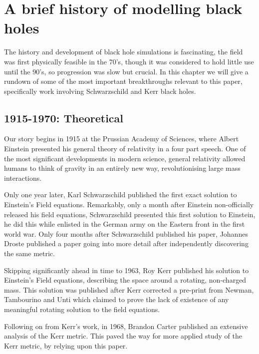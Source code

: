 \documentclass[oneside,openright,frontopenright, singlespacing]{dmathesis}
\begin{document}
\chapter{A brief history of modelling black holes}\label{chap:Chapter1}

	The history and development of black hole simulations is fascinating, the field was first physically feasible in the 70's, though it was considered to hold little use until the 90's, so progression was slow but crucial. In this chapter we will give a rundown of some of the most important breakthroughs relevant to this paper, specifically work involving Schwarzschild and Kerr black holes.

\section{1915-1970: Theoretical}\label{sec:Section1.1}

	Our story begins in 1915 at the Prussian Academy of Sciences, where Albert Einstein presented his general theory of relativity\cite{einstein1915feldgleichungen} in a four part speech. One of the most significant developments in modern science, general relativity allowed humans to think of gravity in an entirely new way, revolutionising large mass interactions.

\vspace{1em}
	Only one year later, Karl Schwarzschild published the first exact solution to Einstein's Field equations\cite{schwarzschild1916gravitationsfeld}. Remarkably, only a month after Einstein non-officially released his field equations, Schwarzschild presented this first solution to Einstein, he did this while enlisted in the German army on the Eastern front in the first world war. Only four months after Schwarzschild published his paper, Johannes Droste published a paper going into more detail after independently discovering the same metric\cite{droste1917field}.

\vspace{1em}
	Skipping significantly ahead in time to 1963, Roy Kerr published his solution to Einstein's Field equations, describing the space around a rotating, non-charged mass\cite{kerr1963gravitational}. This solution was published after Kerr corrected a pre-print from Newman, Tambourino and Unti which claimed to prove the lack of existence of any meaningful rotating solution to the field equations\cite{newman1963empty}.

\vspace{1em}
	Following on from Kerr's work, in 1968, Brandon Carter published an extensive analysis of the Kerr metric\cite{carter1968global}. This paved the way for more applied study of the Kerr metric, by relying upon this paper.
\end{document}
